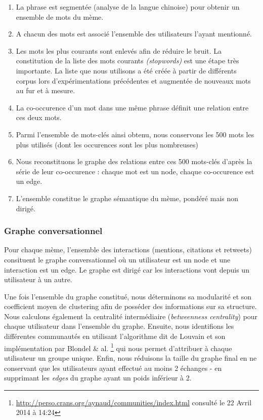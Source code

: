 \begin{enumerate}
\item La phrase est segmentée (analyse de la langue chinoise) pour
obtenir un ensemble de mots du mème.
\item A chacun des mots est associé l{\textquoteright}ensemble des
utilisateurs l{\textquoteright}ayant mentionné.
\item Les mots les plus courants sont enlevés afin de réduire le
bruit. La constitution de la liste des mots courants
\textit{(stopwords) }est une étape très importante. La liste que
nous utilisons a été créée à partir de différents corpus
lors d{\textquoteright}expérimentations précédentes et
augmentée de nouveaux mots au fur et à mesure.
\item La co-occurence d{\textquoteright}un mot dans une même phrase
définit une relation entre ces deux mots.
\item Parmi l{\textquoteright}ensemble de mots-clés ainsi obtenu, nous
conservons les 500 mots les plus utilisés (dont les occurences sont
les plus nombreuses) 
\item Nous reconstituons le graphe des relations entre ces 500
mots-clés d{\textquoteright}après la série de leur co-occurence :
chaque mot est un node, chaque co-occurence est un edge.
\item L{\textquoteright}ensemble constitue le graphe sémantique du
mème, pondéré mais non dirigé.
\end{enumerate}

\subsubsection{Graphe conversationnel}

Pour chaque mème, l{\textquoteright}ensemble des interactions
(mentions, citations et retweets) consituent le graphe conversationnel
o\`u un utilisateur est un node et une interaction est un edge. Le
graphe est dirigé car les interactions vont depuis un utilisateur à
un autre. 

Une fois l{\textquoteright}ensemble du graphe constitué, nous
déterminons sa modularité et son coefficient moyen de clustering
afin de posséder des informations sur sa structure. Nous calculons
également la centralité intermédiaire (\textit{betweenness
centrality}) pour chaque utilisateur dans l{\textquoteright}ensemble du
graphe. Ensuite, nous identifions les différentes communautés en
utilisant l{\textquoteright}algorithme dit de Louvain et son
implémentation par Blondel \& al. \citep{Blondel2008}\footnote{
\url{http://perso.crans.org/aynaud/communities/index.html} consulté
le 22 Avril 2014 à 14:24} qui nous permet d{\textquoteright}attribuer
à chaque utilisateur un groupe unique. Enfin, nous réduisons la
taille du graphe final en ne conservant que les utilisateurs ayant
effectué au moins 2 échanges - en supprimant les \textit{edges} du
graphe ayant un poids inférieur à 2.

